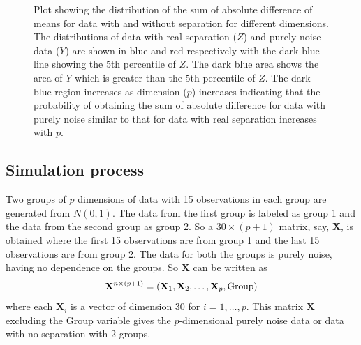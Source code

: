 \begin{figure}[hbtp]
   \centering
       \caption{Plot showing the distribution of the sum of absolute difference of means for data with and without separation for different dimensions. The distributions of data with real separation ($Z$) and purely noise data ($Y$) are shown in blue and red respectively with the dark blue line showing the 5th percentile of $Z$. The dark blue area shows the area of $Y$ which is greater than the 5th percentile of $Z$. The dark blue region increases as dimension ($p$) increases indicating that the probability of obtaining the sum of absolute difference for data with purely noise similar to that for data with real separation increases with $p$. }
     \label{fig:dimen}
\end{figure}

\subsection{Simulation process}

Two groups of $p$ dimensions of data with 15 observations in each group are generated from $N(0, 1)$.  The data from the first group is labeled as group 1 and the data from the second group as group 2. So a $30 \times (p + 1)$ matrix, say, $\mathbf{X}$, is obtained where the first 15 observations are from group 1 and the last 15 observations are from group 2. The data for both the groups is purely noise, having no dependence on the groups. So $\mathbf{X}$ can be written as
$$\mathbf{X}^{n \times (p + 1)} = (\mathbf{X}_1, \mathbf{X}_2, \dots, \mathbf{X}_p, \hbox{Group})$$ where each $\mathbf{X}_i$ is a vector of dimension 30 for $i = 1, \dots, p$. This matrix $\mathbf{X}$ excluding the Group variable gives the $p$-dimensional purely noise data or data with no separation with 2 groups.

